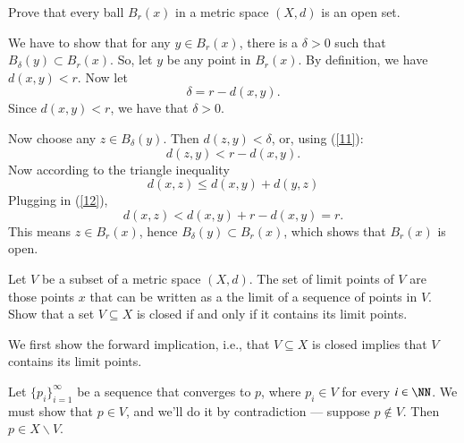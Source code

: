 \documentclass{homework}
\begin{document}
\begin{exercise}{1}
Prove that every ball $B_r(x)$ in a metric space $(X,d)$ is an open set.
\end{exercise}
\solution
We have to show that for any $y\in B_r(x)$, there is a $\delta>0$
such that $B_\delta(y) \subset B_r(x)$.  So, let $y$ be any point
in $B_r(x)$.  By definition, we have $d(x,y)<r$.  Now let
\begin{equation}
\delta = r - d(x,y).\label{11}
\end{equation}
Since $d(x,y)<r$, we have that $\delta>0$.


Now choose any $z\in B_\delta(y)$. Then $d(z,y)<\delta$, or, using (\ref{11}):
\begin{equation}
d(z,y) < r-d(x,y).\label{12}
\end{equation}
Now according to the triangle inequality
\begin{equation*}
d(x,z) \le d(x,y) + d(y,z)
\end{equation*}
Plugging in (\ref{12}),
\begin{equation*}
d(x,z) < d(x,y) + r - d(x,y) = r.
\end{equation*}
This means $z\in B_r(x)$, hence $B_\delta(y) \subset B_r(x)$, which
shows that $B_r(x)$ is open.

\hrulefill

\begin{exercise}{2}
Let $V$ be a subset of a metric space $(X,d)$.  The set of limit
points of $V$ are those points $x$ that can be written as a the limit of a
sequence of points in $V$.  Show that a set $V\subseteq X$ is closed
if and only if it contains its limit points.
\end{exercise}
\solution
We first show the forward implication, i.e., that $V\subseteq X$ is closed
implies that $V$ contains its limit points.

Let $\{p_i\}_{i=1}^\infty$ be a sequence that converges to $p$, where
$p_i\in V$ for every $i\in\NN$.  We must show that $p\in V$, and we'll
do it by contradiction --- suppose $p\not\in V$.  Then $p\in X \backslash V$.
\end{document}
